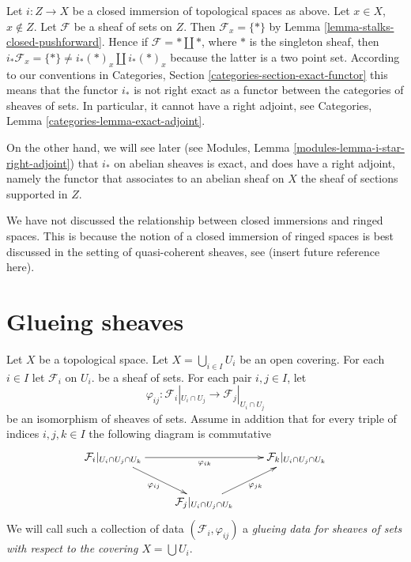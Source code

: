 \begin{remark}
\label{remark-i-star-not-exact}
Let $i : Z \to X$ be a closed immersion of topological spaces as above.
Let $x \in X$, $x \not \in Z$. Let $\mathcal{F}$ be a sheaf of sets
on $Z$. Then $\mathcal{F}_x = \{ * \}$
by Lemma \ref{lemma-stalks-closed-pushforward}.
Hence if $\mathcal{F} = * \amalg *$, where
$*$ is the singleton sheaf, then
$i_*\mathcal{F}_x = \{*\} \not = i_*(*)_x \amalg i_*(*)_x$
because the latter is a two point set.
According to our conventions in
Categories, Section \ref{categories-section-exact-functor}
this means that the functor $i_*$ is not right exact
as a functor between the categories of sheaves of sets.
In particular, it cannot have a right adjoint, see
Categories, Lemma \ref{categories-lemma-exact-adjoint}.

\medskip\noindent
On the other hand, we will see later (see
Modules, Lemma \ref{modules-lemma-i-star-right-adjoint})
that $i_*$ on abelian sheaves is exact, and does have a right
adjoint, namely the functor that associates to an abelian sheaf on $X$
the sheaf of sections supported in $Z$.
\end{remark}

\begin{remark}
\label{remark-closed-immersion-spaces}
We have not discussed the relationship between closed immersions
and ringed spaces. This is because the notion of a closed immersion
of ringed spaces is best discussed in the setting of quasi-coherent
sheaves, see (insert future reference here).
\end{remark}

\section{Glueing sheaves}
\label{section-glueing-sheaves}

\noindent
Let $X$ be a topological space.
Let $X = \bigcup_{i\in I} U_i$ be an open covering.
For each $i \in I$ let $\mathcal{F}_i$ on $U_i$.
be a sheaf of sets. For each pair $i, j \in I$, let
$$
\varphi_{ij} : \mathcal{F}_i|_{U_i \cap U_j}
\longrightarrow
\mathcal{F}_j|_{U_i \cap U_j}
$$
be an isomorphism of sheaves of sets. Assume in addition
that for every triple of indices $i, j, k \in I$ the
following diagram is commutative
$$
\xymatrix{
\mathcal{F}_i|_{U_i \cap U_j \cap U_k}
\ar[rr]_{\varphi_{ik}}
\ar[rd]_{\varphi_{ij}} & &
\mathcal{F}_k|_{U_i \cap U_j \cap U_k} \\
&
\mathcal{F}_j|_{U_i \cap U_j \cap U_k}
\ar[ru]_{\varphi_{jk}}
}
$$
We will call such a collection of data
$(\mathcal{F}_i, \varphi_{ij})$
a {\it glueing data for sheaves of sets with respect to
the covering $X = \bigcup U_i$}.

